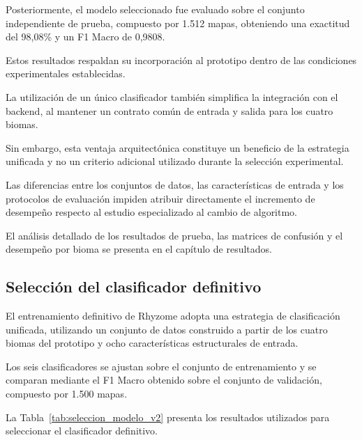 Posteriormente, el modelo seleccionado fue evaluado sobre el conjunto independiente de prueba, compuesto por 1.512 mapas, obteniendo una exactitud del 98,08\% y un F1 Macro de 0,9808.

Estos resultados respaldan su incorporación al prototipo dentro de las condiciones experimentales establecidas.

La utilización de un único clasificador también simplifica la integración con el backend, al mantener un contrato común de entrada y salida para los cuatro biomas.

Sin embargo, esta ventaja arquitectónica constituye un beneficio de la estrategia unificada y no un criterio adicional utilizado durante la selección experimental.

Las diferencias entre los conjuntos de datos, las características de entrada y los protocolos de evaluación impiden atribuir directamente el incremento de desempeño respecto al estudio especializado al cambio de algoritmo.

El análisis detallado de los resultados de prueba, las matrices de confusión y el desempeño por bioma se presenta en el capítulo de resultados.


\subsection{Selección del clasificador definitivo}
\label{subsec:criterios_seleccion_ia}

El entrenamiento definitivo de Rhyzome adopta una estrategia de clasificación unificada, utilizando un conjunto de datos construido a partir de los cuatro biomas del prototipo y ocho características estructurales de entrada.

Los seis clasificadores se ajustan sobre el conjunto de entrenamiento y se comparan mediante el F1 Macro obtenido sobre el conjunto de validación, compuesto por 1.500 mapas.

La Tabla~\ref{tab:seleccion_modelo_v2} presenta los resultados utilizados para seleccionar el clasificador definitivo.


